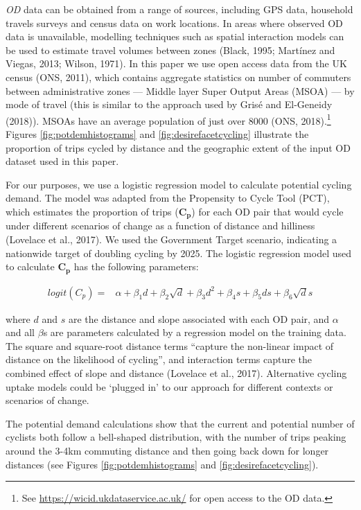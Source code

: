 \documentclass[
]{article}
\begin{document}
\emph{OD} data can be obtained from a range of sources, including GPS data, household travels surveys and census data on work locations.
In areas where observed OD data is unavailable, modelling techniques such as spatial interaction models can be used to estimate travel volumes between zones (Black, 1995; Martínez and Viegas, 2013; Wilson, 1971).
In this paper we use open access data from the UK census (ONS, 2011), which contains aggregate statistics on number of commuters between administrative zones --- Middle layer Super Output Areas (MSOA) --- by mode of travel (this is similar to the approach used by Grisé and El-Geneidy (2018)).
MSOAs have an average population of just over 8000 (ONS, 2018).\footnote{See \url{https://wicid.ukdataservice.ac.uk/} for open access to the OD data.}
Figures \ref{fig:potdemhistograms} and \ref{fig:desirefacetcycling} illustrate the proportion of trips cycled by distance and the geographic extent of the input OD dataset used in this paper.

For our purposes, we use a logistic regression model to calculate potential cycling demand.
The model was adapted from the Propensity to Cycle Tool (PCT), which estimates the proportion of trips (\(\boldsymbol{C_{p}}\)) for each OD pair that would cycle under different scenarios of change as a function of distance and hilliness (Lovelace et al., 2017).
We used the Government Target scenario, indicating a nationwide target of doubling cycling by 2025.
The logistic regression model used to calculate \(\boldsymbol{C_{p}}\) has the following parameters:

\begin{align}\label{eq:pcteqn}
     logit(C_{p}) = & \alpha + \beta_1 d + \beta_2 \sqrt{d} + \beta_3 d^2 + \beta_4 s + \beta_5 ds + \beta_6 \sqrt{d}s 
\end{align}

\noindent where \(d\) and \(s\) are the distance and slope associated with each OD pair, and \(\alpha\) and all \(\beta\)s are parameters calculated by a regression model on the training data.
The square and square-root distance terms ``capture the non-linear impact of distance on the likelihood of cycling'', and interaction terms capture the combined effect of slope and distance (Lovelace et al., 2017).
Alternative cycling uptake models could be `plugged in' to our approach for different contexts or scenarios of change.

The potential demand calculations show that the current and potential number of cyclists both follow a bell-shaped distribution, with the number of trips peaking around the 3-4km commuting distance and then going back down for longer distances (see Figures \ref{fig:potdemhistograms} and \ref{fig:desirefacetcycling}).
\end{document}
